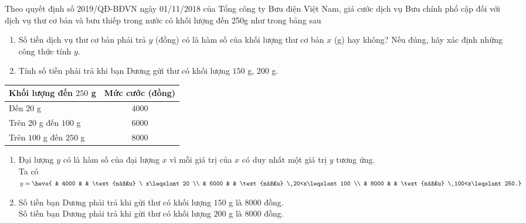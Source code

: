 \begin{bt}%
	Theo quyết định số 2019/QĐ-BĐVN ngày 01/11/2018 của Tổng công ty Bưu điện Việt Nam, giá cước dịch vụ Bưu chính phổ cập đối với dịch vụ thư cơ bản và bưu thiếp trong nước có khối lượng đến 250g như trong bảng sau
	\immini
	{
		\begin{enumerate}
			\item Số tiền dịch vụ thư cơ bản phải trả $y$ (đồng) có là hàm số của khối lượng thư cơ bản $x$ (g) hay không? Nếu đúng, hãy xác định những công thức tính $y$.
			\item Tính số tiền phải trả khi bạn Dương gửi thư có khối lượng $150$ g, $200$ g.
		\end{enumerate}
	}
	{
		\begin{tabular}{|l|c|}
			\hline
			Khối lượng đến $250$ g & Mức cước (đồng) \\
			\hline
			Đến $20$ g & $4 000$ \\
			\hline
			Trên $20$ g đến $100$ g & $6 000$ \\
			\hline
			Trên $100$ g đến $250$ g & $8 000$ \\
			\hline
		\end{tabular}
	}
	\loigiai
	{
		\begin{enumerate}
			\item Đại lượng $y$ có là hàm số của đại lượng $x$ vì mỗi giá trị của $x$ có duy nhất một giá trị $y$ tương ứng. \\
			Ta có $y=\heva{ & 4000 & & \text{nếu} \ x\leqslant20 \\ & 6000 & & \text{nếu} \ 20<x\leqslant100 \\ & 8000 & & \text{nếu} \ 100<x\leqslant250.}$ \\
			\item Số tiền bạn Dương phải trả khi gửi thư có khối lượng $150$ g là $8000$ đồng. \\
			Số tiền bạn Dương phải trả khi gửi thư có khối lượng $200$ g là $8000$ đồng.
		\end{enumerate}
	}
\end{bt}

